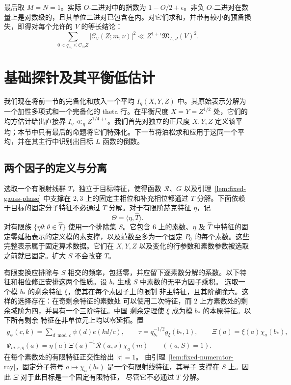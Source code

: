 \documentclass[11pt,a4paper]{article}
\numberwithin{equation}{section}
\numberwithin{figure}{section}
\theoremstyle{definition}
\theoremstyle{remark}
\begin{document}
最后取 $M=N=1$。实际 $O$-二进对中的指数为 $1-O/2+\epsilon$。非负 $O$-二进对在数量上是对数级的，且其单位二进对已包含在内。对它们求和，并带有较小的预备损失，即得对每个允许的 $V$ 的等长结论：
\begin{equation}\label{eq:unmarked-balanced-completed-moment}
 \sum_{0<q_m\le C_mZ}|\mathcal C_V(Z;m,\nu)|^2
 \ll Z^{1+\epsilon}\mathfrak M_{A,J}(V)^2.
\end{equation}

\section{基础探针及其平衡低估计}\label{sec:probe}

我们现在将前一节的完备化和放入一个平均 $I_\eta(X,Y,Z)$ 中。其原始表示分解为一个加性多项式和一个完备化的 theta 行。在平衡尺度 $X=Y=Z^{1/2}$ 处，它们的均方估计给出直接界 $I_\eta\ll_\eta Z^{1/4+\epsilon}$。我们首先对独立的正尺度 $X,Y,Z$ 定义该平均；本节中只有最后的命题将它们特殊化。下一节将泊松求和应用于这同一个平均，并在其主行中识别出目标 $L$ 函数的倒数。

\subsection{两个因子的定义与分离}

选取一个有限射线群 $T$，独立于目标特征，使得函数 $\mathcal R$、$G$ 以及引理~\ref{lem:fixed-gauss-phase} 中支撑在 $2,3$ 上的固定主相位和补充相位都通过 $T$ 分解。下面依赖于目标的固定分子特征不必通过 $T$ 分解。对于有限阶赫克特征 $\eta$，记
\[
 \Theta=\langle\eta,\widehat T\rangle.
\]
对有限族 $\{\eta\theta:\theta\in\widehat T\}$ 使用一个排除集 $S$。它包含 $6$ 上的素数、$\eta$ 及 $\widehat T$ 中特征的固定零延拓表示的定义模的素支撑，以及范数至多为一个固定 $P_0$ 的每个素数。这些完整表示属于固定算术数据。它们在 $X,Y,Z$ 以及变化的行参数和素数参数被选取之前就已固定。扩大 $S$ 不会改变 $T$。

有限变换应排除与 $S$ 相交的频率，包括零，并应留下逐素数分解的系数。以下特征和相位修正安排这两个性质。设 $b_*$ 生成 $S$ 中素数的无平方因子乘积。
选取一个模 $b_*$ 的剩余特征 $\xi$，使其在每个素因子上的限制
非主特征，且其阶整除六。这样的选择存在：在奇剩余特征的素数处
可以使用二次特征，而 $2$ 上方素数处的剩余域阶为四，并具有一个三阶特征。中国
剩余定理使 $\xi$ 成为模 $b_*$ 的本原特征。以下所有剩余
特征在非单位元上均以零延拓。置
\[
 \begin{gathered}
 g_\psi(c,k)=\sum_{d\bmod c}\psi(d)e(kd/c),\qquad
 \tau=q_{b_*}^{-1/2}g_\xi(b_*,1),\qquad
 \Xi(a)=\xi(a)\chi_a(b_*),\\
 \Psi_{m,s,\eta}(a)=
       \eta(a)\Xi(a)^{-1}\mathcal R(a,s)\chi_a(m)
       \qquad ((a,S)=1).
 \end{gathered}
\]
在每个素数处的有限特征正交性给出 $|\tau|=1$。
由引理~\ref{lem:fixed-numerator-ray}，固定分子符号
$a\mapsto\chi_a(b_*)$ 是一个有限射线特征，其导子
支撑在 $S$ 上。因此 $\Xi$ 对于此目标是一个固定有限特征，
尽管它不必通过 $T$ 分解。
\end{document}
